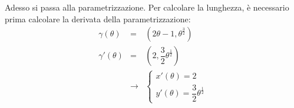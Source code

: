 \documentclass[a4paper]{article}
\begin{document}
	\noindent
	Adesso si passa alla parametrizzazione. Per calcolare la lunghezza, è necessario prima calcolare la derivata della parametrizzazione:
	\begin{equation*}
		\begin{array}{rcl}
			\gamma\left(\theta\right) &=& \left(2\theta - 1, \theta^{\frac{3}{2}}\right) \\ [1em]
			\gamma'\left(\theta\right) &=& \left(2, \dfrac{3}{2}\theta^{\frac{1}{2}}\right) \\ [1em]
			&\rightarrow& \begin{cases}
				x'\left(\theta\right) = 2 \\
				y'\left(\theta\right) = \dfrac{3}{2}\theta^{\frac{1}{2}}
			\end{cases}
		\end{array}
	\end{equation*}\newpage
\end{document}
